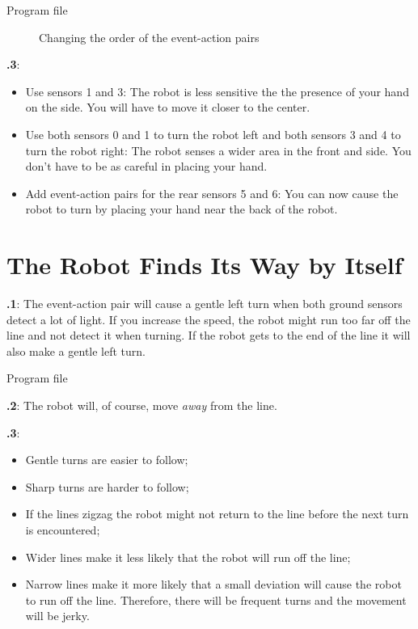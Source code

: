 \documentclass[12pt,a4paper,english]{article}
\begin{document}
{\raggedleft \hfill Program file }

\begin{figure}[hbt]
\begin{center}
\caption{Changing the order of the event-action pairs}\label{fig.change}
\end{center}
\end{figure}

\textbf{\thesection.3}: 
\begin{itemize}

\item Use sensors 1 and 3: The robot is less sensitive the the presence
of your hand on the side. You will have to move it closer to the center.

\item Use both sensors 0 and 1 to turn the robot left and both sensors 3
and 4 to turn the robot right: The robot senses a wider area in the
front and side. You don't have to be as careful in placing your hand.

\item Add event-action pairs for the rear sensors 5 and 6: You can now
cause the robot to turn by placing your hand near the back of the robot.

\end{itemize}


\section{The Robot Finds Its Way by Itself}


\textbf{\thesection.1}: The event-action pair 
will cause a gentle left turn when both ground sensors detect a lot of
light. If you increase the speed, the robot might run too far off the
line and not detect it when turning. If the robot gets to the end of the
line it will also make a gentle left turn.

{\raggedleft \hfill Program file }

\textbf{\thesection.2}: The robot will, of course, move \emph{away} from
the line.

\textbf{\thesection.3}:
\begin{itemize}
\item Gentle turns are easier to follow; 
\item Sharp turns are harder to follow; 
\item If the lines zigzag the robot might not return to the line before
the next turn is encountered;
\item Wider lines make it less likely that the robot will run off the line; 
\item Narrow lines make it more likely that a small deviation will cause
the robot to run off the line. Therefore, there will be frequent turns
and the movement will be jerky.
\end{itemize}
\end{document}
